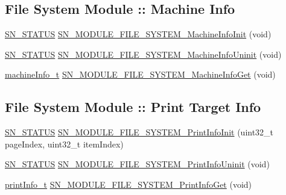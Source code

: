 \subsection*{File System Module \+:\+: Machine Info}
\begin{DoxyCompactItemize}
\item 
\hyperlink{group__SYSTEM__ERROR_ga4540713b9a7a18ce44d78c3a10f7442f}{S\+N\+\_\+\+S\+T\+A\+T\+US} \hyperlink{group__MODULE__FILE__SYSTEM_ga4fba82e15bc9a77407cacaa1a6aadd50}{S\+N\+\_\+\+M\+O\+D\+U\+L\+E\+\_\+\+F\+I\+L\+E\+\_\+\+S\+Y\+S\+T\+E\+M\+\_\+\+Machine\+Info\+Init} (void)
\item 
\hyperlink{group__SYSTEM__ERROR_ga4540713b9a7a18ce44d78c3a10f7442f}{S\+N\+\_\+\+S\+T\+A\+T\+US} \hyperlink{group__MODULE__FILE__SYSTEM_ga86125af6adcd6218d4ebdb484e11d273}{S\+N\+\_\+\+M\+O\+D\+U\+L\+E\+\_\+\+F\+I\+L\+E\+\_\+\+S\+Y\+S\+T\+E\+M\+\_\+\+Machine\+Info\+Uninit} (void)
\item 
\hyperlink{structmachine__information}{machine\+Info\+\_\+t} \hyperlink{group__MODULE__FILE__SYSTEM_ga647e18cfc2415cb546d69b327ed76232}{S\+N\+\_\+\+M\+O\+D\+U\+L\+E\+\_\+\+F\+I\+L\+E\+\_\+\+S\+Y\+S\+T\+E\+M\+\_\+\+Machine\+Info\+Get} (void)
\end{DoxyCompactItemize}
\subsection*{File System Module \+:\+: Print Target Info}
\begin{DoxyCompactItemize}
\item 
\hyperlink{group__SYSTEM__ERROR_ga4540713b9a7a18ce44d78c3a10f7442f}{S\+N\+\_\+\+S\+T\+A\+T\+US} \hyperlink{group__MODULE__FILE__SYSTEM_gadbd5aafed31faed399abd08193a04bc8}{S\+N\+\_\+\+M\+O\+D\+U\+L\+E\+\_\+\+F\+I\+L\+E\+\_\+\+S\+Y\+S\+T\+E\+M\+\_\+\+Print\+Info\+Init} (uint32\+\_\+t page\+Index, uint32\+\_\+t item\+Index)
\item 
\hyperlink{group__SYSTEM__ERROR_ga4540713b9a7a18ce44d78c3a10f7442f}{S\+N\+\_\+\+S\+T\+A\+T\+US} \hyperlink{group__MODULE__FILE__SYSTEM_gaddd6a0e37c98d7a5aba88db31875e44e}{S\+N\+\_\+\+M\+O\+D\+U\+L\+E\+\_\+\+F\+I\+L\+E\+\_\+\+S\+Y\+S\+T\+E\+M\+\_\+\+Print\+Info\+Uninit} (void)
\item 
\hyperlink{structprint__information}{print\+Info\+\_\+t} \hyperlink{group__MODULE__FILE__SYSTEM_ga6679d04769a997531a277ba3940cf16c}{S\+N\+\_\+\+M\+O\+D\+U\+L\+E\+\_\+\+F\+I\+L\+E\+\_\+\+S\+Y\+S\+T\+E\+M\+\_\+\+Print\+Info\+Get} (void)
\end{DoxyCompactItemize}


